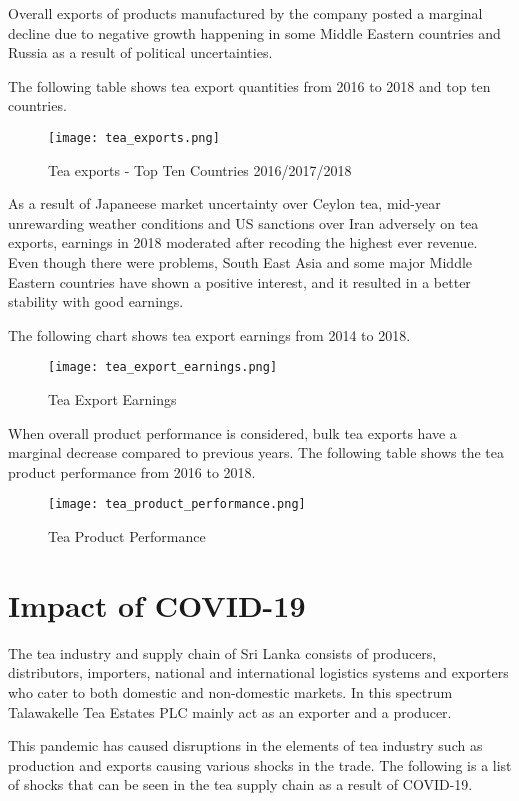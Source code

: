 \documentclass[12pt]{report}
\begin{document}
Overall exports of products manufactured by the company posted a marginal decline due to negative growth happening in some Middle Eastern countries and Russia as a result of political uncertainties.

The following table shows tea export quantities from 2016 to 2018 and top ten countries.

\begin{figure}[H]
	\centering
	\texttt{[image: tea\_exports.png]}
	\caption{Tea exports - Top Ten Countries 2016/2017/2018}
\end{figure}

As a result of Japaneese market uncertainty over Ceylon tea, mid-year unrewarding weather conditions and US sanctions over Iran adversely on tea exports, earnings in 2018 moderated after recoding the highest ever revenue. Even though there were problems, South East Asia and some major Middle Eastern countries have shown a positive interest, and it resulted in a better stability with good earnings.

The following chart shows tea export earnings from 2014 to 2018.

\begin{figure}[H]
	\centering
	\texttt{[image: tea\_export\_earnings.png]}
	\caption{Tea Export Earnings}
\end{figure}

When overall product performance is considered, bulk tea exports have a marginal decrease compared to previous years. The following table shows the tea product performance from 2016 to 2018.

\begin{figure}[H]
	\centering
	\texttt{[image: tea\_product\_performance.png]}
	\caption{Tea Product Performance}
\end{figure}


\chapter{Impact of COVID-19}
The tea industry and supply chain of Sri Lanka consists of producers, distributors, importers, national and international logistics systems and exporters who cater to both domestic and non-domestic markets. In this spectrum Talawakelle Tea Estates PLC mainly act as an exporter and a producer.

This pandemic has caused disruptions in the elements of tea industry such as production and exports causing various shocks in the trade. The following is a list of shocks  that can be seen in the tea supply chain as a result of COVID-19.
\end{document}
